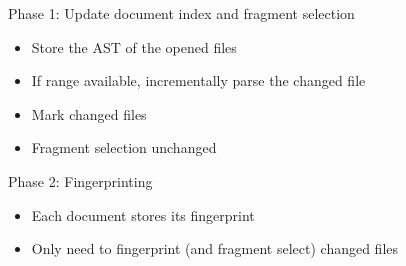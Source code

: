 \documentclass[aspectratio=1610, xcolor=table]{beamer}
\begin{document}
\begin{frame}{Phase 1: Update document index and fragment selection}
    \begin{itemize}
        \item Store the AST of the opened files
        \item If range available, incrementally parse the changed file
        \item Mark changed files
        \item Fragment selection unchanged
    \end{itemize}
\end{frame}

\begin{frame}{Phase 2: Fingerprinting}
    \begin{itemize}
        \item Each document stores its fingerprint
        \item Only need to fingerprint (and fragment select) changed files
    \end{itemize}
\end{frame}
\end{document}
